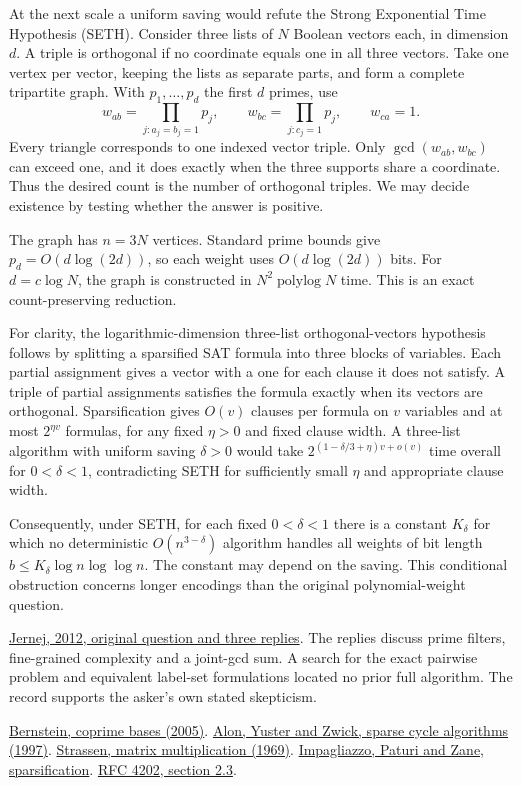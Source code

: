 \documentclass[11pt,letterpaper]{article}
\newcommand{\heading}[1]{\par\smallskip{\large\bfseries\color{ink}#1}\par\smallskip}
\begin{document}
At the next scale a uniform saving would refute the Strong Exponential Time Hypothesis (SETH). Consider three lists of $N$ Boolean vectors each, in dimension $d$. A triple is orthogonal if no coordinate equals one in all three vectors. Take one vertex per vector, keeping the lists as separate parts, and form a complete tripartite graph. With $p_1,\ldots,p_d$ the first $d$ primes, use
\[
 w_{ab}=\prod_{j:a_j=b_j=1}p_j,\qquad
 w_{bc}=\prod_{j:c_j=1}p_j,\qquad w_{ca}=1.
\]
Every triangle corresponds to one indexed vector triple. Only $\gcd(w_{ab},w_{bc})$ can exceed one, and it does exactly when the three supports share a coordinate. Thus the desired count is the number of orthogonal triples. We may decide existence by testing whether the answer is positive.
 
The graph has $n=3N$ vertices. Standard prime bounds give $p_d=O(d\log(2d))$, so each weight uses $O(d\log(2d))$ bits. For $d=c\log N$, the graph is constructed in $N^2\operatorname{polylog}N$ time. This is an exact count-preserving reduction.
 
For clarity, the logarithmic-dimension three-list orthogonal-vectors hypothesis follows by splitting a sparsified SAT formula into three blocks of variables. Each partial assignment gives a vector with a one for each clause it does not satisfy. A triple of partial assignments satisfies the formula exactly when its vectors are orthogonal. Sparsification gives $O(v)$ clauses per formula on $v$ variables and at most $2^{\eta v}$ formulas, for any fixed $\eta>0$ and fixed clause width. A three-list algorithm with uniform saving $\delta>0$ would take $2^{(1-\delta/3+\eta)v+o(v)}$ time overall for $0<\delta<1$, contradicting SETH for sufficiently small $\eta$ and appropriate clause width.
 
Consequently, under SETH, for each fixed $0<\delta<1$ there is a constant $K_\delta$ for which no deterministic $O(n^{3-\delta})$ algorithm handles all weights of bit length $b\le K_\delta\log n\log\log n$. The constant may depend on the saving. This conditional obstruction concerns longer encodings than the original polynomial-weight question.
\heading{Sources and verification}
\small
\href{https://mathoverflow.net/q/104415}{Jernej, 2012, original question and three replies}. The replies discuss prime filters, fine-grained complexity and a joint-gcd sum. A search for the exact pairwise problem and equivalent label-set formulations located no prior full algorithm. The record supports the asker's own stated skepticism.
 
\href{https://cr.yp.to/lineartime/dcba-20040404.pdf}{Bernstein, coprime bases (2005)}.
\href{https://doi.org/10.1007/BF02523189}{Alon, Yuster and Zwick, sparse cycle algorithms (1997)}.
\href{https://doi.org/10.1007/BF02165411}{Strassen, matrix multiplication (1969)}.
\href{https://cseweb.ucsd.edu/~paturi/myPapers/pubs/ImpagliazzoPaturiZane_1998_focs.pdf}{Impagliazzo, Paturi and Zane, sparsification}.
\href{https://www.rfc-editor.org/rfc/rfc4202#section-2.3}{RFC 4202, section 2.3}.
 
\end{document}
